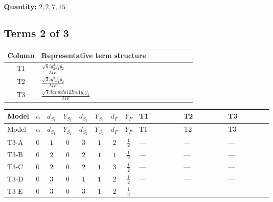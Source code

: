 \documentclass[8pt]{article}
\begin{document}
\begin{landscape}
\begin{longtable}{@{}llcccccc >{\raggedright\arraybackslash}p{0.21\linewidth} >{\raggedright\arraybackslash}p{0.21\linewidth} >{\raggedright\arraybackslash}p{0.21\linewidth}@{}}
\midrule
\bottomrule
\end{longtable}
\clearpage
\noindent\textbf{Quantity: }$\mathrm{2,2,7,15}$\par\smallskip
\subsection*{Terms 2 of 3}
\begin{center}
\begin{tabular}{@{}c >{\raggedright\arraybackslash}p{0.82\linewidth}@{}}
\toprule
Column & Representative term structure \\
\midrule
T1 & \(\displaystyle \frac{\sqrt{6} i g_{2}^{2} \overline{y_{1}} \overline{y_{2}}}{MF}\) \\
\midrule
T2 & \(\displaystyle \frac{\sqrt{3} i g_{1}^{2} \overline{y_{1}} \overline{y_{2}}}{MF}\) \\
\midrule
T3 & \(\displaystyle \frac{\sqrt{3} i lambda12Inv1 \overline{y_{1}} \overline{y_{2}}}{MF}\) \\
\midrule
\bottomrule
\end{tabular}
\end{center}
\smallskip
\tiny
\begin{longtable}{@{}llcccccc >{\raggedright\arraybackslash}p{0.21\linewidth} >{\raggedright\arraybackslash}p{0.21\linewidth} >{\raggedright\arraybackslash}p{0.21\linewidth}@{}}
\toprule
Model & $\alpha$ & $d_{S_1}$ & $Y_{S_1}$ & $d_{S_2}$ & $Y_{S_2}$ & $d_F$ & $Y_F$ & T1 & T2 & T3 \\
\midrule
\endfirsthead
\toprule
Model & $\alpha$ & $d_{S_1}$ & $Y_{S_1}$ & $d_{S_2}$ & $Y_{S_2}$ & $d_F$ & $Y_F$ & T1 & T2 & T3 \\
\midrule
\endhead
T3-A & $0$ & $1$ & $0$ & $3$ & $1$ & $2$ & $\frac{1}{2}$ & --- & --- & --- \\
\midrule
T3-B & $0$ & $2$ & $0$ & $2$ & $1$ & $1$ & $\frac{1}{2}$ & --- & --- & --- \\
\midrule
T3-C & $0$ & $2$ & $0$ & $2$ & $1$ & $3$ & $\frac{1}{2}$ & --- & --- & --- \\
\midrule
T3-D & $0$ & $3$ & $0$ & $1$ & $1$ & $2$ & $\frac{1}{2}$ & --- & --- & --- \\
\midrule
T3-E & $0$ & $3$ & $0$ & $3$ & $1$ & $2$ & $\frac{1}{2}$ & \scriptsize\adjustbox{max width=\linewidth}{$\begin{gathered} - \frac{\sqrt{6} i g_{2}^{2} \overline{y_{1}} \overline{y_{2}}}{3 MF}\end{gathered}$} & \scriptsize\adjustbox{max width=\linewidth}{$\begin{gathered} - \frac{\sqrt{3} i g_{1}^{2} \overline{y_{1}} \overline{y_{2}}}{8 MF}\end{gathered}$} & \scriptsize\adjustbox{max width=\linewidth}{$\begin{gathered} \frac{\sqrt{3} i lambda12Inv1 \overline{y_{1}} \overline{y_{2}}}{6 MF}\end{gathered}$} \\

\end{longtable}
\end{landscape}
\end{document}
